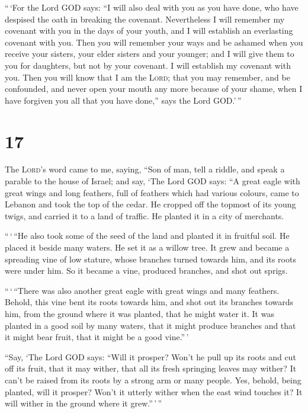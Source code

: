  ``\,`For the Lord GOD says: ``I will also deal with you
as you have done, who have despised the oath in breaking the covenant.
 Nevertheless I will remember my covenant with you in the
days of your youth, and I will establish an everlasting covenant with
you.  Then you will remember your ways and be ashamed
when you receive your sisters, your elder sisters and your younger; and
I will give them to you for daughters, but not by your covenant.
 I will establish my covenant with you. Then you will
know that I am the \textsc{Lord};  that you may remember,
and be confounded, and never open your mouth any more because of your
shame, when I have forgiven you all that you have done,'' says the Lord
GOD.'\,''

\hypertarget{section-16}{%
\section{17}\label{section-16}}

 The \textsc{Lord}'s word came to me, saying,
 ``Son of man, tell a riddle, and speak a parable to the
house of Israel;  and say, `The Lord GOD says: ``A great
eagle with great wings and long feathers, full of feathers which had
various colours, came to Lebanon and took the top of the cedar.
 He cropped off the topmost of its young twigs, and
carried it to a land of traffic. He planted it in a city of merchants.

 ``\,`\,``He also took some of the seed of the land and
planted it in fruitful soil. He placed it beside many waters. He set it
as a willow tree.  It grew and became a spreading vine of
low stature, whose branches turned towards him, and its roots were under
him. So it became a vine, produced branches, and shot out sprigs.

 ``\,`\,``There was also another great eagle with great
wings and many feathers. Behold, this vine bent its roots towards him,
and shot out its branches towards him, from the ground where it was
planted, that he might water it.  It was planted in a good
soil by many waters, that it might produce branches and that it might
bear fruit, that it might be a good vine.''\,'

 ``Say, `The Lord GOD says: ``Will it prosper? Won't he
pull up its roots and cut off its fruit, that it may wither, that all
its fresh springing leaves may wither? It can't be raised from its roots
by a strong arm or many people.  Yes, behold, being
planted, will it prosper? Won't it utterly wither when the east wind
touches it? It will wither in the ground where it grew.''\,'\,''

